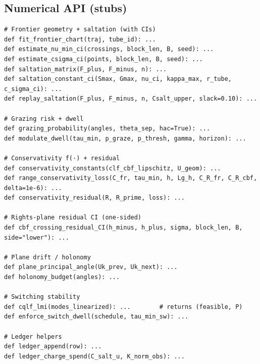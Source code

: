 \documentclass[10pt]{article}
\begin{document}
\subsection*{Numerical API (stubs)}
\begin{lstlisting}
# Frontier geometry + saltation (with CIs)
def fit_frontier_chart(traj, tube_id): ...
def estimate_nu_min_ci(crossings, block_len, B, seed): ...
def estimate_csigma_ci(points, block_len, B, seed): ...
def saltation_matrix(F_plus, F_minus, n): ...
def saltation_constant_ci(Smax, Gmax, nu_ci, kappa_max, r_tube, c_sigma_ci): ...
def replay_saltation(F_plus, F_minus, n, Csalt_upper, slack=0.10): ...

# Grazing risk + dwell
def grazing_probability(angles, theta_sep, hac=True): ...
def modulate_dwell(tau_min, p_graze, p_thresh, gamma, horizon): ...

# Conservativity f(·) + residual
def conservativity_constants(clf_cbf_lipschitz, U_geom): ...
def range_conservativity_loss(C_fr, tau_min, h, Lg_h, C_R_fr, C_R_cbf, delta=1e-6): ...
def conservativity_residual(R, R_prime, loss): ...

# Rights-plane residual CI (one-sided)
def cbf_crossing_residual_CI(h_minus, h_plus, sigma, block_len, B, side="lower"): ...

# Plane drift / holonomy
def plane_principal_angle(Uk_prev, Uk_next): ...
def holonomy_budget(angles): ...

# Switching stability
def cqlf_lmi(modes_linearized): ...        # returns (feasible, P)
def enforce_switch_dwell(schedule, tau_min_sw): ...

# Ledger helpers
def ledger_append(row): ...
def ledger_charge_spend(C_salt_u, K_norm_obs): ...
\end{lstlisting}
\end{document}
